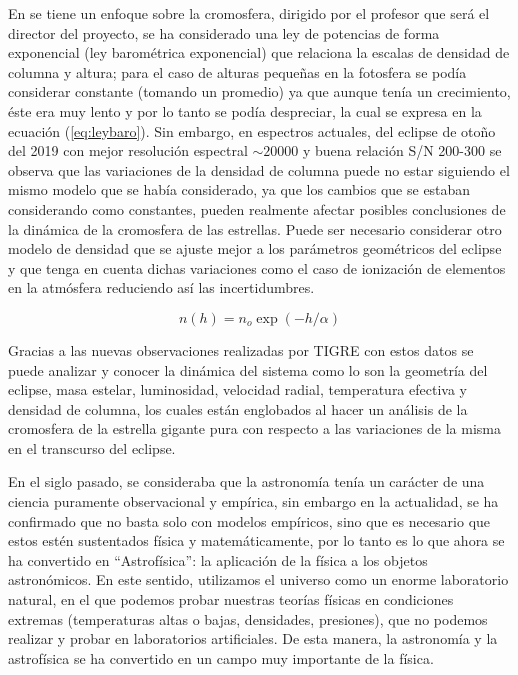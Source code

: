 \documentclass[11pt]{article}
\begin{document}
En \cite{kps1O} se tiene un enfoque sobre la cromosfera, dirigido por el profesor que será el director del proyecto, se ha considerado una ley de potencias de forma exponencial (ley barométrica exponencial)  que relaciona la escalas de densidad de columna y altura; para el caso de alturas pequeñas en la fotosfera se podía considerar constante (tomando un promedio) ya que aunque tenía un crecimiento, éste era muy lento y por lo tanto se podía despreciar, la cual se expresa en la ecuación (\ref{eq:leybaro}). Sin embargo, en espectros actuales, del eclipse de otoño del 2019 con mejor resolución espectral $\sim 20000$ y buena relación S/N 200-300 se observa que las variaciones de la densidad de columna puede no estar siguiendo el mismo modelo que se había considerado, ya que los cambios que se estaban considerando como constantes, pueden realmente afectar posibles conclusiones de la dinámica de la cromosfera de las estrellas. Puede ser necesario considerar otro modelo de densidad que se ajuste mejor a los parámetros geométricos del eclipse y que tenga en cuenta dichas variaciones como el caso de ionización de elementos en la atmósfera reduciendo así las incertidumbres.

\begin{equation}
    n(h) = n_o \exp{(-h/\alpha)}
    \label{eq:leybaro}
\end{equation}
\vspace{2mm}

Gracias a las nuevas observaciones realizadas por TIGRE con estos datos se puede analizar y conocer la dinámica del sistema como lo son la geometría del eclipse, masa estelar, luminosidad, velocidad radial, temperatura efectiva y densidad de columna, los cuales están englobados al hacer un análisis de la cromosfera de la estrella gigante pura con respecto a las variaciones de la misma en el transcurso del eclipse.

En el siglo pasado, se consideraba que la astronomía tenía un carácter de una ciencia puramente observacional y empírica, sin embargo en la actualidad, se ha confirmado que no basta solo con modelos empíricos, sino que es necesario que estos estén sustentados física y matemáticamente, por lo tanto es lo que ahora se ha convertido en ``Astrofísica'': la aplicación de la física a los objetos astronómicos. En este sentido, utilizamos el universo como un enorme laboratorio natural, en el que podemos probar nuestras teorías físicas en condiciones extremas (temperaturas altas o bajas, densidades, presiones), que no podemos realizar y probar en laboratorios artificiales. De esta manera, la astronomía y la astrofísica se ha convertido en un campo muy importante de la física.
\end{document}
